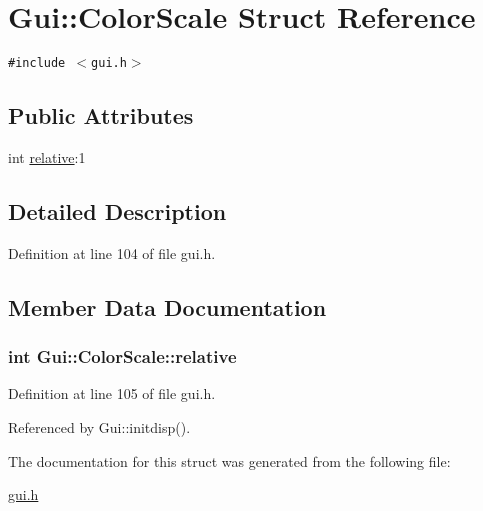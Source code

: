\hypertarget{structGui_1_1ColorScale}{
\section{Gui::ColorScale Struct Reference}
\label{structGui_1_1ColorScale}
}
{\tt \#include $<$gui.h$>$}

\subsection*{Public Attributes}
\begin{CompactItemize}
\item 
int \hyperlink{structGui_1_1ColorScale_1dcbc6de1e1d3793e78e90138eee1e28}{relative}:1
\end{CompactItemize}


\subsection{Detailed Description}


Definition at line 104 of file gui.h.

\subsection{Member Data Documentation}
\hypertarget{structGui_1_1ColorScale_1dcbc6de1e1d3793e78e90138eee1e28}{
\subsubsection[{relative}]{\setlength{\rightskip}{0pt plus 5cm}int {\bf Gui::ColorScale::relative}}}
\label{structGui_1_1ColorScale_1dcbc6de1e1d3793e78e90138eee1e28}




Definition at line 105 of file gui.h.

Referenced by Gui::initdisp().

The documentation for this struct was generated from the following file:\begin{CompactItemize}
\item 
\hyperlink{gui_8h}{gui.h}\end{CompactItemize}
